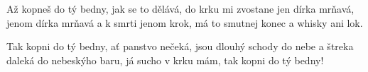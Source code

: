 \beginverse{}
Až kopneš do tý bedny, jak se to dělává,
do krku mi zvostane jen dírka mrňavá,
jenom dírka mrňavá a k smrti jenom krok,
má to smutnej konec a whisky ani lok. 
\endverse{}

\beginchorus{}
Tak kopni do tý bedny, ať panstvo nečeká,
jsou dlouhý schody do nebe a štreka daleká
do nebeskýho baru, já sucho v krku mám,
tak kopni do tý bedny!
\endchorus{}

\endsong{}
